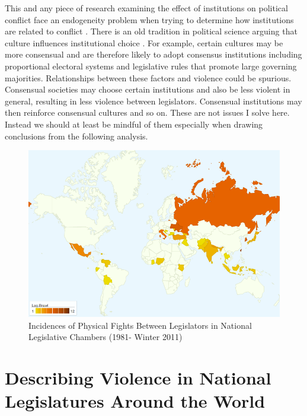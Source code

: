 \documentclass[a4paper]{article}\usepackage{graphicx, color}
\begin{document}
This and any piece of research examining the effect of institutions on political conflict face an endogeneity problem when trying to determine how institutions are related to conflict \citep[][751]{Carey2000}. There is an old tradition in political science \citep[][528--529]{Frye1997} arguing that culture influences institutional choice \citep[in particular see][]{Almond1963}. For example, certain cultures may be more consensual and are therefore likely to adopt consensus institutions \citep[][22-23]{Lijphart2003} including proportional electoral systems and legislative rules that promote large governing majorities. Relationships between these factors and violence could be spurious. Consensual societies may choose certain institutions and also be less violent in general, resulting in less violence between legislators. Consensual institutions may then reinforce consensual cultures and so on. These are not issues I solve here. Instead we should at least be mindful of them especially when drawing conclusions from the following analysis.

\begin{figure}[h!]
    \centering
    \caption{Incidences of Physical Fights Between Legislators in National Legislative Chambers (1981- Winter 2011)}
    \label{leg_map}
        \includegraphics[width = 13cm]{incidence_map.png}
\end{figure}

\section{Describing Violence in National Legislatures Around the World}
\end{document}
